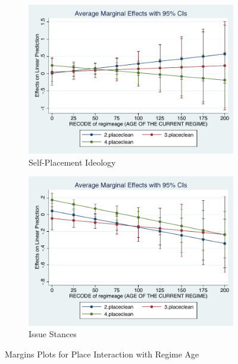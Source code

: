 \documentclass[12pt, titlepage]{article}
\begin{document}
\begin{figure}[H]
	\centering
	\begin{subfigure}[b]{0.475\textwidth}   
		\centering 
		\includegraphics[width=\textwidth]{Margins/IdeoPlaceAge}
		\caption{Self-Placement Ideology}
	\end{subfigure}
	\hfill
	\begin{subfigure}[b]{0.475\textwidth}
		\centering 
		\includegraphics[width=\textwidth]{Margins/LibPlaceAge}
		\caption{Issue Stances}
	\end{subfigure}
	\caption{Margins Plots for Place Interaction with Regime Age}
	\label{Age}
\end{figure}
\end{document}
